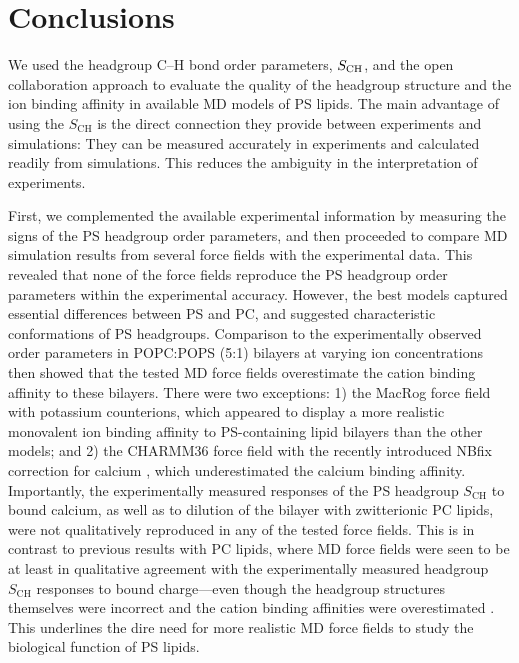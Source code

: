 \documentclass[journal=jpcbfk,manuscript=article]{achemso}
\begin{document}
\section{Conclusions}

We used the headgroup C--H bond order parameters, $S_{\rm CH}$, and the open collaboration approach to evaluate the quality
of the headgroup structure and the ion binding affinity 
in available MD models of PS lipids.
The main advantage of using the $S_\mathrm{CH}$ is the direct connection they provide
between experiments and simulations: They can be measured accurately in experiments and calculated readily from simulations. 
This reduces the ambiguity in the interpretation of experiments.

First, we complemented the available experimental information \cite{browning80,roux90} by measuring the signs of the PS headgroup order parameters,
and then proceeded to compare MD simulation results from several force fields with the experimental data.
This revealed that none of the force fields
reproduce the PS headgroup order parameters within the experimental accuracy.
However, the best models captured essential differences between PS and PC, and
suggested characteristic conformations of PS headgroups.
Comparison to the experimentally observed order parameters in POPC:POPS (5:1) bilayers  at varying ion
concentrations \cite{roux90} then showed that the tested MD force fields
overestimate the cation binding affinity to these bilayers. There were two exceptions: 1) the MacRog force field with potassium counterions, which appeared to display a more realistic monovalent ion binding
affinity to PS-containing lipid bilayers than the other models; and 2) the CHARMM36 force field with the recently introduced
NBfix correction for calcium \cite{kim16}, which underestimated the calcium binding affinity.
Importantly, the experimentally measured responses of the PS headgroup $S_\mathrm{CH}$ to bound calcium, as well as to dilution of the bilayer with zwitterionic PC lipids, were not
qualitatively reproduced in any of the tested force fields.
This is in contrast to previous results with PC lipids,
where MD force fields were seen to be at least in qualitative agreement with the experimentally measured headgroup $S_\mathrm{CH}$ responses to bound charge---even
though the headgroup structures themselves were
incorrect and the cation binding affinities were overestimated \cite{catte16}.
This underlines the dire need for more realistic MD force fields to study the biological function of PS lipids.
\end{document}
